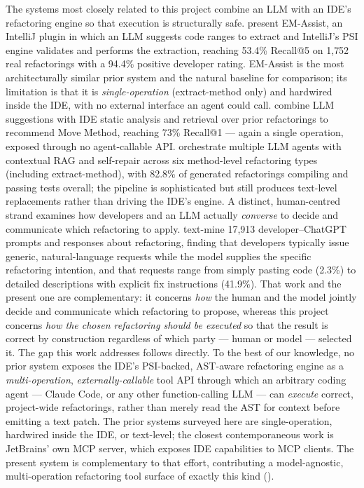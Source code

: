 The systems most closely related to this project combine an LLM with an IDE's
refactoring engine so that execution is structurally safe. \citet{emassist2024}
present EM-Assist, an IntelliJ plugin in which an LLM suggests code ranges to
extract and IntelliJ's PSI engine validates and performs the extraction,
reaching 53.4\% Recall@5 on 1{,}752 real refactorings with a 94.4\% positive
developer rating. EM-Assist is the most architecturally similar prior system and
the natural baseline for comparison; its limitation is that it is
\emph{single-operation} (extract-method only) and hardwired inside the IDE, with
no external interface an agent could call.
\citet{movemethod2025} combine LLM suggestions with IDE static analysis and
retrieval over prior refactorings to recommend Move Method, reaching 73\%
Recall@1 --- again a single operation, exposed through no agent-callable API.
\citet{mantra2025} orchestrate multiple LLM agents with contextual RAG and
self-repair across six method-level refactoring types (including extract-method),
with 82.8\% of generated refactorings compiling and passing tests overall; the
pipeline is sophisticated but still produces text-level replacements rather than
driving the IDE's engine.
A distinct, human-centred strand examines how developers and an LLM actually
\emph{converse} to decide and communicate which refactoring to apply.
\citet{refactoringconversations2024} text-mine 17{,}913 developer--ChatGPT prompts
and responses about refactoring, finding that developers typically issue generic,
natural-language requests while the model supplies the specific refactoring
intention, and that requests range from simply pasting code (2.3\%) to detailed
descriptions with explicit fix instructions (41.9\%). That work and the present one
are complementary: it concerns \emph{how} the human and the model jointly decide and
communicate which refactoring to propose, whereas this project concerns \emph{how
the chosen refactoring should be executed} so that the result is correct by
construction regardless of which party --- human or model --- selected it.
The gap this work addresses follows directly. To the best of our knowledge, no prior
system exposes the IDE's PSI-backed, AST-aware refactoring engine as a
\emph{multi-operation}, \emph{externally-callable} tool API through which an arbitrary
coding agent --- Claude Code, or any other function-calling LLM --- can \emph{execute}
correct, project-wide refactorings, rather than merely read the AST for context before
emitting a text patch. The prior systems surveyed here are single-operation, hardwired
inside the IDE, or text-level; the closest contemporaneous work is JetBrains' own MCP
server, which exposes IDE capabilities to MCP clients. The present system is
complementary to that effort, contributing a model-agnostic, multi-operation
refactoring tool surface of exactly this kind ().

